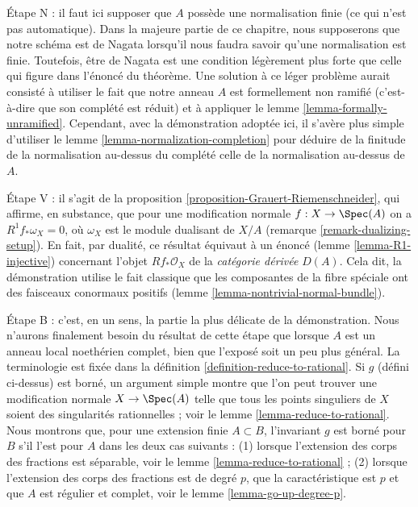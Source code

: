 \medskip\noindent Étape N : il faut ici supposer que $A$ possède une normalisation finie (ce qui n'est pas automatique). Dans la majeure partie de ce chapitre, nous supposerons que notre schéma est de Nagata lorsqu'il nous faudra savoir qu'une normalisation est finie. Toutefois, être de Nagata est une condition légèrement plus forte que celle qui figure dans l'énoncé du théorème. Une solution à ce léger problème aurait consisté à utiliser le fait que notre anneau $A$ est formellement non ramifié (c'est-à-dire que son complété est réduit) et à appliquer le lemme \ref{lemma-formally-unramified}. Cependant, avec la démonstration adoptée ici, il s'avère plus simple d'utiliser le lemme \ref{lemma-normalization-completion} pour déduire de la finitude de la normalisation au-dessus du complété celle de la normalisation au-dessus de $A$.

\medskip\noindent Étape V : il s'agit de la proposition \ref{proposition-Grauert-Riemenschneider}, qui affirme, en substance, que pour une modification normale $f : X \to \Spec(A)$ on a $R^1f_*\omega_X = 0$, où $\omega_X$ est le module dualisant de $X/A$ (remarque \ref{remark-dualizing-setup}). En fait, par dualité, ce résultat équivaut à un énoncé (lemme \ref{lemma-R1-injective}) concernant l'objet $Rf_*\mathcal{O}_X$ de la {\it catégorie dérivée} $D(A)$. Cela dit, la démonstration utilise le fait classique que les composantes de la fibre spéciale ont des faisceaux conormaux positifs (lemme \ref{lemma-nontrivial-normal-bundle}).

\medskip\noindent Étape B : c'est, en un sens, la partie la plus délicate de la démonstration. Nous n'aurons finalement besoin du résultat de cette étape que lorsque $A$ est un anneau local noethérien complet, bien que l'exposé soit un peu plus général. La terminologie est fixée dans la définition \ref{definition-reduce-to-rational}. Si $g$ (défini ci-dessus) est borné, un argument simple montre que l'on peut trouver une modification normale $X \to \Spec(A)$ telle que tous les points singuliers de $X$ soient des singularités rationnelles ; voir le lemme \ref{lemma-reduce-to-rational}. Nous montrons que, pour une extension finie $A \subset B$, l'invariant $g$ est borné pour $B$ s'il l'est pour $A$ dans les deux cas suivants : (1) lorsque l'extension des corps des fractions est séparable, voir le lemme \ref{lemma-reduce-to-rational} ; (2) lorsque l'extension des corps des fractions est de degré $p$, que la caractéristique est $p$ et que $A$ est régulier et complet, voir le lemme \ref{lemma-go-up-degree-p}.

